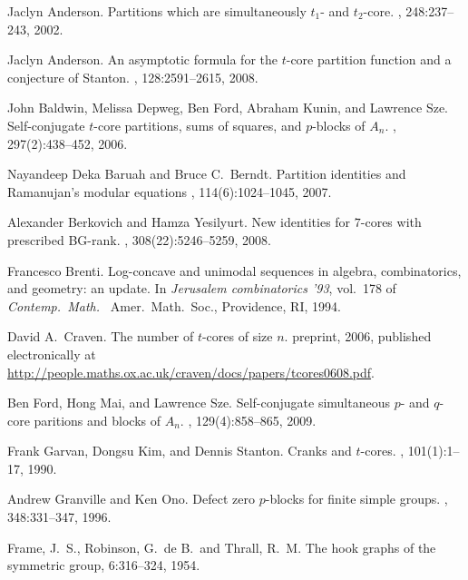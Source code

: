 \documentclass[12pt,leqno]{amsart}
\numberwithin{equation}{section}
\theoremstyle{definition}
\begin{document}
\begin{thebibliography}{1}

Jaclyn Anderson.  
\newblock Partitions which are simultaneously $t_1$- and $t_2$-core.  
, 248:237--243, 2002.

Jaclyn Anderson.
\newblock An asymptotic formula for the {$t$}-core partition function and a conjecture of Stanton.
, 128:2591--2615, 2008.

John Baldwin, Melissa Depweg, Ben Ford, Abraham Kunin, and Lawrence Sze.
\newblock Self-conjugate {$t$}-core partitions, sums of squares, and {$p$}-blocks of {$A_n$}.
, 297(2):438--452, 2006.

Nayandeep Deka Baruah and Bruce C.\ Berndt.
\newblock Partition identities and Ramanujan's modular equations
, 114(6):1024--1045, 2007. 

Alexander Berkovich and Hamza Yesilyurt.
\newblock New identities for $7$-cores with prescribed BG-rank.
, 308(22):5246--5259, 2008.

Francesco Brenti.
\newblock Log-concave and unimodal sequences in algebra, combinatorics, and geometry: an update. 
\newblock 
In {\em Jerusalem combinatorics '93}, vol.\ 178 of {\em Contemp.\ Math.\ } Amer.\ Math.\ Soc., Providence, RI, 1994. 

David A.\ Craven.
\newblock The number of $t$-cores of size $n$.
\newblock preprint, 2006, published electronically at \newline \url{http://people.maths.ox.ac.uk/craven/docs/papers/tcores0608.pdf}.

Ben Ford, Hong Mai, and Lawrence Sze.
\newblock Self-conjugate simultaneous $p$- and $q$-core paritions and blocks of $A_n$.
, 129(4):858--865, 2009.

Frank Garvan, Dongsu Kim, and Dennis Stanton.
\newblock Cranks and $t$-cores.
, 101(1):1--17, 1990.

Andrew Granville and Ken Ono.
\newblock Defect zero $p$-blocks for finite simple groups.
, 348:331--347, 1996.

Frame, J.\ S., Robinson, G.\ de B.\, and Thrall, R.\ M.
\newblock The hook graphs of the symmetric group,
 6:316--324, 1954.


\end{thebibliography}
\end{document}
